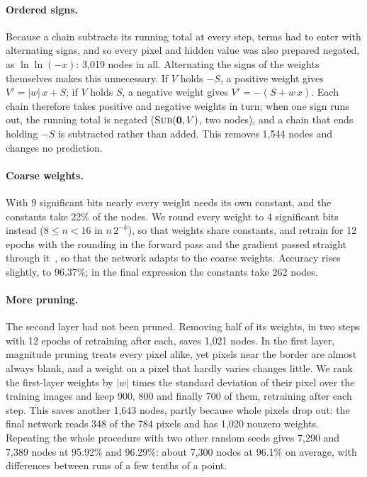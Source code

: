 \documentclass[11pt]{article}
\begin{document}
\paragraph{Ordered signs.}
Because a chain subtracts its running total at every step, terms had to enter
with alternating signs, and so every pixel and hidden value was also prepared
negated, as $\ln\ln(-x)$: 3{,}019 nodes in all. Alternating the signs of the
weights themselves makes this unnecessary. If $V$ holds $-S$, a positive weight
gives $V'=|w|\,x+S$; if $V$ holds $S$, a negative weight gives
$V'=-(S+w\,x)$. Each chain therefore takes positive and negative weights in
turn; when one sign runs out, the running total is negated
($\textsc{Sub}(\mathbf{0},V)$, two nodes), and a chain that ends holding $-S$
is subtracted rather than added. This removes 1{,}544 nodes and changes no
prediction.

\paragraph{Coarse weights.}
With 9 significant bits nearly every weight needs its own constant, and the
constants take 22\% of the nodes. We round every weight to 4 significant bits
instead ($8\le n<16$ in $n\,2^{-k}$), so that weights share constants, and
retrain for 12 epochs with the rounding in the forward pass and the gradient
passed straight through it~\cite{bengio2013,jacob2018}, so that the network
adapts to the coarse weights. Accuracy rises slightly, to 96.37\%; in the
final expression the constants take 262 nodes.

\paragraph{More pruning.}
The second layer had not been pruned. Removing half of its weights, in two
steps with 12 epochs of retraining after each, saves 1{,}021 nodes. In the
first layer, magnitude pruning treats every pixel alike, yet pixels near the
border are almost always blank, and a weight on a pixel that hardly varies
changes little. We rank the first-layer weights by $|w|$ times the standard
deviation of their pixel over the training images and keep 900, 800 and
finally 700 of them, retraining after each step. This saves another 1{,}643
nodes, partly because whole pixels drop out: the final network reads 348 of
the 784 pixels and has 1{,}020 nonzero weights. Repeating the whole procedure
with two other random seeds gives 7{,}290 and 7{,}389 nodes at 95.92\% and
96.29\%: about 7{,}300 nodes at 96.1\% on average, with differences between
runs of a few tenths of a point.
\end{document}
